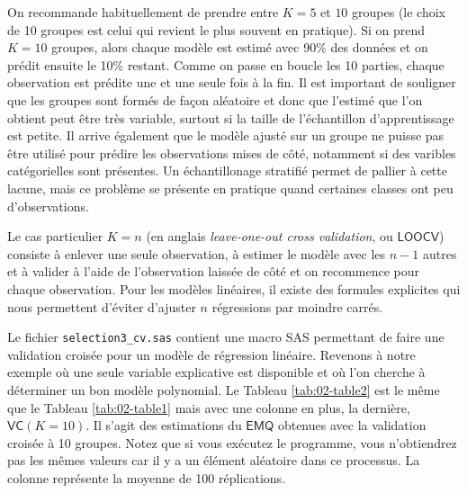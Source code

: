 \documentclass[
  11pt,
  letterpaper,
]{book}
\theoremstyle{definition}
\theoremstyle{definition}
\theoremstyle{definition}
\theoremstyle{remark}
\begin{document}
On recommande habituellement de prendre entre \(K=5\) et \(10\) groupes (le choix de 10 groupes est celui qui revient le plus souvent en pratique). Si on prend \(K=10\) groupes, alors chaque modèle est estimé avec 90\% des données et on prédit ensuite le 10\% restant. Comme on passe en boucle les 10 parties, chaque observation est prédite une et une seule fois à la fin. Il est important de souligner que les groupes sont formés de façon aléatoire et donc que l'estimé que l'on obtient peut être très variable, surtout si la taille de l'échantillon d'apprentissage est petite. Il arrive également que le modèle ajusté sur un groupe ne puisse pas être utilisé pour prédire les observations mises de côté, notamment si des varibles catégorielles sont présentes. Un échantillonage stratifié permet de pallier à cette lacune, mais ce problème se présente en pratique quand certaines classes ont peu d'observations.

Le cas particulier \(K=n\) (en anglais \emph{leave-one-out cross validation}, ou \(\mathsf{LOOCV}\)) consiste à enlever une seule observation, à estimer le modèle avec les \(n-1\) autres et à valider à l'aide de l'observation laissée de côté et on recommence pour chaque observation. Pour les modèles linéaires, il existe des formules explicites qui nous permettent d'éviter d'ajuster \(n\) régressions par moindre carrés.

Le fichier \texttt{selection3\_cv.sas} contient une macro SAS permettant de faire une validation croisée pour un modèle de régression linéaire.
Revenons à notre exemple où une seule variable explicative est disponible et où l'on cherche à déterminer un bon modèle polynomial. Le Tableau \ref{tab:02-table2} est le même que le Tableau \ref{tab:02-table1} mais avec une colonne en plus, la dernière, \(\mathsf{VC} (K=10)\). Il s'agit des estimations du \(\mathsf{EMQ}\) obtenues avec la validation croisée à 10 groupes. Notez que si vous exécutez le programme, vous n'obtiendrez pas les mêmes valeurs car il y a un élément aléatoire dans ce processus. La colonne représente la moyenne de 100 réplications.
\end{document}
